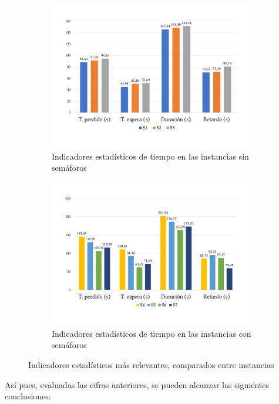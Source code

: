 \begin{figure}[h]
\begin{subfigure}[t]{.49\textwidth}
      \centering
      \includegraphics[width=\textwidth]{report/images/estudio/est-sin.pdf}
        \caption{Indicadores estadísticos de tiempo en las instancias sin semáforos}
    \end{subfigure}
    \hfill
    \begin{subfigure}[t]{.49\textwidth}
      \centering
      \includegraphics[width=\textwidth]{report/images/estudio/est-con.pdf}
      \caption{Indicadores estadísticos de tiempo en las instancias con semáforos}
    \end{subfigure}
    \caption{Indicadores estadísticos más relevantes, comparados entre instancias}
    \label{fig:estudio:indicadores-relevantes}
\end{figure}

Así pues, evaluadas las cifras anteriores, se pueden alcanzar las siguientes conclusiones:

